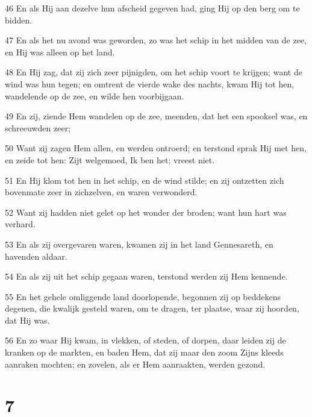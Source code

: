 \par 46 En als Hij aan dezelve hun afscheid gegeven had, ging Hij op den berg om te bidden.
\par 47 En als het nu avond was geworden, zo was het schip in het midden van de zee, en Hij was alleen op het land.
\par 48 En Hij zag, dat zij zich zeer pijnigden, om het schip voort te krijgen; want de wind was hun tegen; en omtrent de vierde wake des nachts, kwam Hij tot hen, wandelende op de zee, en wilde hen voorbijgaan.
\par 49 En zij, ziende Hem wandelen op de zee, meenden, dat het een spooksel was, en schreeuwden zeer;
\par 50 Want zij zagen Hem allen, en werden ontroerd; en terstond sprak Hij met hen, en zeide tot hen: Zijt welgemoed, Ik ben het; vreest niet.
\par 51 En Hij klom tot hen in het schip, en de wind stilde; en zij ontzetten zich bovenmate zeer in zichzelven, en waren verwonderd.
\par 52 Want zij hadden niet gelet op het wonder der broden; want hun hart was verhard.
\par 53 En als zij overgevaren waren, kwamen zij in het land Gennesareth, en havenden aldaar.
\par 54 En als zij uit het schip gegaan waren, terstond werden zij Hem kennende.
\par 55 En het gehele omliggende land doorlopende, begonnen zij op beddekens degenen, die kwalijk gesteld waren, om te dragen, ter plaatse, waar zij hoorden, dat Hij was.
\par 56 En zo waar Hij kwam, in vlekken, of steden, of dorpen, daar leiden zij de kranken op de markten, en baden Hem, dat zij maar den zoom Zijns kleeds aanraken mochten; en zovelen, als er Hem aanraakten, werden gezond.

\chapter{7}

